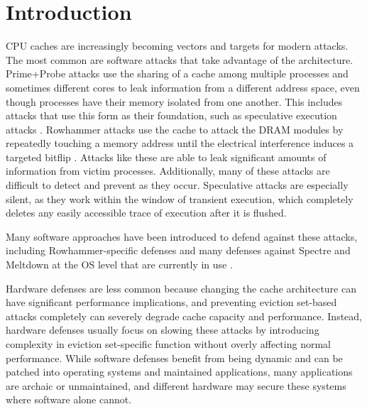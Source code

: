 \documentclass[letterpaper]{article}
\begin{document}
\section{Introduction}

CPU caches are increasingly becoming vectors and targets for modern attacks.
The most common are software attacks that take advantage of the architecture.
Prime+Probe attacks use the sharing of a cache among multiple processes and sometimes different cores
to leak information from a different address space,
even though processes have their memory isolated from one another.
This includes attacks that use this form as their foundation,
such as speculative execution attacks
\cite{Gofetch}
\cite{Spectre}
\cite{Meltdown}
\cite{TikTag}
\cite{PACMan}
\cite{SPAM}
\cite{LeakyWay}
\cite{Streamline}
\cite{TransientAttackSurvey}.
Rowhammer attacks use the cache to attack the DRAM modules
by repeatedly touching a memory address until the electrical interference induces a targeted bitflip
\cite{Rowhammer}.
Attacks like these are able to leak significant amounts of information from victim processes.
Additionally, many of these attacks are difficult to detect and prevent as they occur.
Speculative attacks are especially silent,
as they work within the window of transient execution,
which completely deletes any easily accessible trace of execution after it is flushed.

Many software approaches have been introduced to defend against these attacks,
including Rowhammer-specific defenses
\cite{RowhammerDefense} %
and many defenses against Spectre and Meltdown at the OS level that are currently in use
.

Hardware defenses are less common because changing the cache architecture can have
significant performance implications,
and preventing eviction set-based attacks completely can severely degrade
cache capacity and performance.
Instead, hardware defenses usually focus on slowing these attacks
by introducing complexity in eviction set-specific function
without overly affecting normal performance.
While software defenses benefit from being dynamic
and can be patched into operating systems and maintained applications,
many applications are archaic or unmaintained, and different hardware may secure these systems
where software alone cannot.
\end{document}
